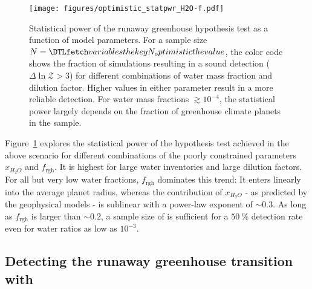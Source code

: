 \documentclass[twocolumn]{aastex631}
\begin{document}
\begin{figure}[ht!]
    \begin{centering}
        \texttt{[image: figures/optimistic\_statpwr\_H2O-f.pdf]}
        \caption{
            Statistical power of the runaway greenhouse hypothesis test as a function of model parameters.
            For a sample size $N = \var{N_optimistic}$, the color code shows the fraction of simulations resulting in a sound detection ($\Delta \ln \mathcal{Z} > 3$) for different combinations of water mass fraction and dilution factor.
            Higher values in either parameter result in a more reliable detection.
            For water mass fractions $\gtrsim 10^{-4}$, the statistical power largely depends on the fraction of greenhouse climate planets in the sample.
        }
        \label{fig:statpwr_H2O-f}
    \end{centering}
\end{figure}
Figure~\ref{fig:statpwr_H2O-f} explores the statistical power of the hypothesis test achieved in the above scenario for different combinations of the poorly constrained parameters $x_{H_2O}$ and $f_\mathrm{rgh}$.
It is highest for large water inventories and large dilution factors.
 For all but very low water fractions, $f_\mathrm{rgh}$ dominates this trend: It enters linearly into the average planet radius, whereas the contribution of $x_{H_2O}$ - as predicted by the geophysical models - is sublinear with a power-law exponent of $\sim 0.3$.
As long as $f_\mathrm{rgh}$ is larger than $\sim 0.2$, a sample size of  is sufficient for a $\SI{50}{\percent}$ detection rate even for water ratios as low as $10^{-3}$.



\subsection{Detecting the runaway greenhouse transition with \plato}\label{sec:res_samplesize}
\end{document}
